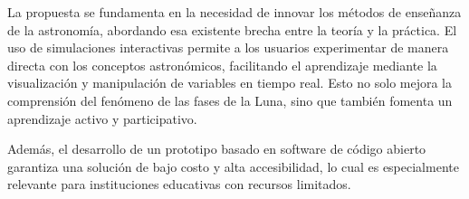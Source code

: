 La propuesta se fundamenta en la necesidad de innovar los métodos de enseñanza de la astronomía, abordando esa existente brecha entre la teoría y la práctica. El uso de simulaciones interactivas permite a los usuarios experimentar de manera directa con los conceptos astronómicos, facilitando el aprendizaje mediante la visualización y manipulación de variables en tiempo real. Esto no solo mejora la comprensión del fenómeno de las fases de la Luna, sino que también fomenta un aprendizaje activo y participativo.

Además, el desarrollo de un prototipo basado en software de código abierto garantiza una solución de bajo costo y alta accesibilidad, lo cual es especialmente relevante para instituciones educativas con recursos limitados. 
